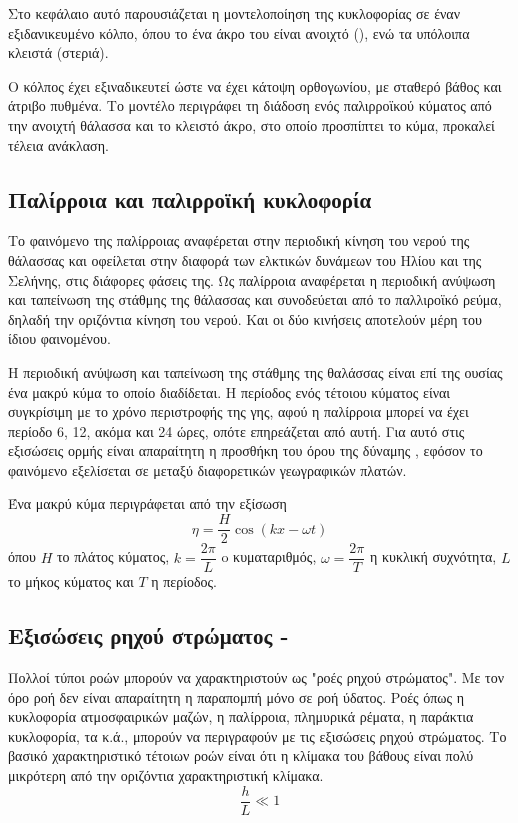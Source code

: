 Στο κεφάλαιο αυτό παρουσιάζεται η μοντελοποίηση της κυκλοφορίας σε έναν εξιδανικευμένο κόλπο, όπου το ένα άκρο του είναι ανοιχτό (), ενώ τα υπόλοιπα κλειστά (στεριά).

Ο κόλπος έχει εξιναδικευτεί ώστε να έχει κάτοψη ορθογωνίου, με σταθερό βάθος και άτριβο πυθμένα. Το μοντέλο περιγράφει τη διάδοση ενός παλιρροϊκού κύματος από την ανοιχτή θάλασσα και το κλειστό άκρο, στο οποίο προσπίπτει το κύμα, προκαλεί τέλεια ανάκλαση.
\subsection{Παλίρροια και παλιρροϊκή κυκλοφορία}
Το φαινόμενο της παλίρροιας αναφέρεται στην περιοδική κίνηση του νερού της θάλασσας και οφείλεται στην διαφορά των ελκτικών δυνάμεων του Ηλίου και της Σελήνης, στις διάφορες φάσεις της.
Ως παλίρροια αναφέρεται η περιοδική ανύψωση και ταπείνωση της στάθμης της θάλασσας και συνοδεύεται από το παλλιροϊκό ρεύμα, δηλαδή την οριζόντια κίνηση του νερού. Και οι δύο κινήσεις αποτελούν μέρη του ίδιου φαινομένου.

Η περιοδική ανύψωση και ταπείνωση της στάθμης της θαλάσσας είναι επί της ουσίας ένα μακρύ κύμα το οποίο διαδίδεται. Η περίοδος ενός τέτοιου κύματος είναι συγκρίσιμη με το χρόνο περιστροφής της γης, αφού η παλίρροια μπορεί να έχει περίοδο 6, 12, ακόμα και 24 ώρες, οπότε επηρεάζεται από αυτή. Για αυτό στις εξισώσεις ορμής είναι απαραίτητη η προσθήκη του όρου της δύναμης \cor, εφόσον το φαινόμενο εξελίσεται σε μεταξύ διαφορετικών γεωγραφικών πλατών.

Ένα μακρύ κύμα περιγράφεται από την εξίσωση 
\begin{equation}
    η = \dfrac{H}{2}\cos{(kx-ωt)}
\end{equation}
όπου $Η$ το πλάτος κύματος, $k=\dfrac{2π}{L}$ o κυματαριθμός, $ω=\dfrac{2π}{T}$ η κυκλική συχνότητα, $L$ το μήκος κύματος και $T$ η περίοδος.

\subsection{Εξισώσεις ρηχού στρώματος - }
Πολλοί τύποι ροών μπορούν να χαρακτηριστούν ως "ροές ρηχού στρώματος". Με τον όρο ροή δεν είναι απαραίτητη η παραπομπή μόνο σε ροή ύδατος. Ροές όπως η κυκλοφορία ατμοσφαιρικών μαζών, η παλίρροια, πλημυρικά ρέματα, η παράκτια κυκλοφορία, τα  κ.ά., μπορούν να περιγραφούν με τις εξισώσεις ρηχού στρώματος. Το βασικό χαρακτηριστικό τέτοιων ροών είναι ότι η κλίμακα του βάθους είναι πολύ μικρότερη από την οριζόντια χαρακτηριστική κλίμακα.
\begin{equation}
    \dfrac{h}{L} \ll 1
\end{equation}

